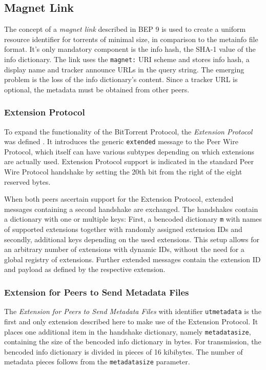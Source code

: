 \documentclass[10pt, a4paper, twoside]{scrartcl}
\renewcommand{\_}{\origunderscore\allowbreak}
\begin{document}
\subsection{Magnet Link}
The concept of a \emph{magnet link} described in BEP 9 \cite{bep9} is used to create a uniform resource identifier for torrents of minimal size, in comparison to the metainfo file format. It's only mandatory component is the info hash, the SHA-1 value of the info dictionary. The link uses the \texttt{magnet:} URI scheme and stores info hash, a display name and tracker announce URLs in the query string. The emerging problem is the loss of the info dictionary's content. Since a tracker URL is optional, the metadata must be obtained from other peers.

\subsubsection{Extension Protocol}
To expand the functionality of the BitTorrent Protocol, the \emph{Extension Protocol} was defined \cite{bep10}. It introduces the generic \texttt{extended} message to the Peer Wire Protocol, which itself can have various subtypes depending on which extensions are actually used. Extension Protocol support is indicated in the standard Peer Wire Protocol handshake by setting the 20th bit from the right of the eight reserved bytes.

When both peers ascertain support for the Extension Protocol, extended messages containing a second handshake are exchanged. The handshakes contain a dictionary with one or multiple keys: First, a bencoded dictionary \texttt{m} with names of supported extensions together with randomly assigned extension IDs and secondly, additional keys depending on the used extensions. This setup allows for an arbitrary number of extensions with dynamic IDs, without the need for a global registry of extensions. Further extended messages contain the extension ID and payload as defined by the respective extension.

\subsubsection{Extension for Peers to Send Metadata Files}
The \emph{Extension for Peers to Send Metadata Files} \cite{bep9} with identifier \texttt{ut\_metadata} is the first and only extension described here to make use of the Extension Protocol. It places one additional item in the handshake dictionary, namely \texttt{metadata\_size}, containing the size of the bencoded info dictionary in bytes. For transmission, the bencoded info dictionary is divided in pieces of 16 kibibytes. The number of metadata pieces follows from the \texttt{metadata\_size} parameter.
\end{document}
